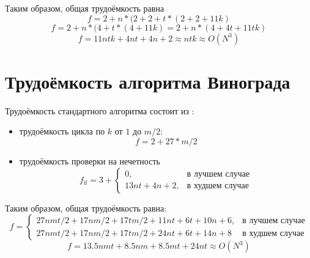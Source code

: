 Таким образом, общая трудоёмкость равна
 \begin{equation}f = 2 + n * (2 + 2 + t * (2 + 2 + 11k) \end{equation}
  \begin{equation}f = 2 + n * (4 + t * (4 + 11k) =  2  + n * (4 + 4t +11tk) \end{equation}
   \begin{equation}f = 11ntk + 4nt + 4n + 2 \approx ntk \approx O(N^3) \end{equation}

\section{Трудоёмкость алгоритма Винограда}
Трудоёмкость стандартного алгоритма состоит из :
\begin{itemize}
	 памяти и инициализация векторов:  \begin{equation}f =  17nm/2 + 17tm/2 + 6t + 6n + 4  \end{equation}
	 цикла по \(i\) от \( 1 \) до \(n \): \begin{equation}f = 2 + n * (2 + f_{body})  \end{equation}
	 цикла по \(j\) от \( 1 \) до \(t \): \begin{equation}f = 2 + t * (9 + f_{body})  \end{equation}
	\item трудоёмкость цикла по \(k\) от \( 1 \) до \(m / 2 \): \begin{equation}f = 2 + 27 * m/2  \end{equation}
	\item трудоёмкость проверки на нечетность
	\begin{equation}\label{eq:if_complexity}
		f_{\text{if}} = 3 + \begin{cases}
			0, & \text{в лучшем случае} \\
			13nt + 4n + 2, & \text{в худшем случае}
		\end{cases}
	\end{equation}
\end{itemize}
Таким образом, общая трудоёмкость равна:
\begin{equation}\label{eq:if_complexity}
	f = \begin{cases}
		27nmt/2 + 17nm/2 + 17tm/2 + 11nt + 6t + 10n + 6, & \text{в лучшем случае} \\
		27nmt/2 + 17nm/2 + 17tm/2 + 24nt + 6t + 14n + 8 & \text{в худшем случае}
	\end{cases}
\end{equation}
\begin{equation}f = 13.5nmt + 8.5nm + 8.5mt + 24nt \approx O(N^3) \end{equation}

